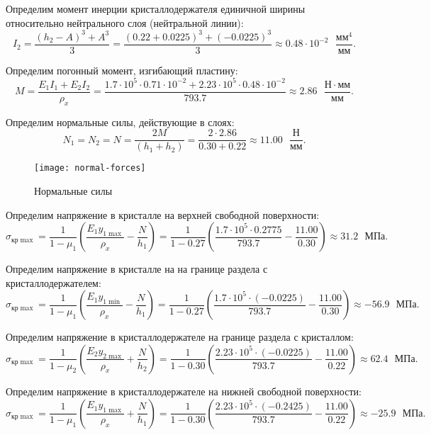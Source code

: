 Определим момент инерции кристаллодержателя единичной ширины относительно нейтрального слоя (нейтральной линии):
\[
    I_2 = \frac{(h_2 - A)^3 + A^3}{3}
        = \frac{(0.22 + 0.0225)^3 + (-0.0225)^3}{3}
        \approx 0.48 \cdot 10^{-2} \text{ } \frac{мм^4}{мм}.
\]

Определим погонный момент, изгибающий пластину:
\[
    M = \frac{E_1 I_1 + E_2 I_2}{\rho_x}
      = \frac{1.7 \cdot 10^5 \cdot 0.71 \cdot 10^{-2} + 2.23 \cdot 10^5 \cdot 0.48 \cdot 10^{-2}}{793.7}
      \approx 2.86 \text{ } \frac{Н \cdot мм}{мм}.
\]

Определим нормальные силы, действующие в слоях:
\[
    N_1 = N_2 = N
        = \frac{2M}{(h_1 + h_2)}
        = \frac{2 \cdot 2.86}{0.30 + 0.22}
        \approx 11.00 \text{ } \frac{Н}{мм}.
\]

\begin{figure}[h]
    \centering
    \texttt{[image: normal-forces]}
    \caption{Нормальные силы}
    \label{fig:normal-forces}
\end{figure}

Определим напряжение в кристалле на верхней свободной поверхности:
\[
    \sigma_{кр \max} = \frac{1}{1 - \mu_1} \left(\frac{E_1 y_{1\max}}{\rho_x} - \frac{N}{h_1}\right)
                     = \frac{1}{1 - 0.27} \left(\frac{1.7 \cdot 10^5 \cdot 0.2775}{793.7} - \frac{11.00}{0.30}\right)
                     \approx 31.2 \text{ } МПа.
\]

Определим напряжение в кристалле на на границе раздела с кристаллодержателем:
\[
    \sigma_{кр \max} = \frac{1}{1 - \mu_1} \left(\frac{E_1 y_{1\min}}{\rho_x} - \frac{N}{h_1}\right)
                     = \frac{1}{1 - 0.27} \left(\frac{1.7 \cdot 10^5 \cdot (-0.0225)}{793.7} - \frac{11.00}{0.30}\right)
                     \approx -56.9\text{ } МПа.
\]

Определим напряжение в кристаллодержателе на границе раздела с кристаллом:
\[
    \sigma_{кр \max} = \frac{1}{1 - \mu_2} \left(\frac{E_2 y_{2\max}}{\rho_x} + \frac{N}{h_2}\right)
                     = \frac{1}{1 - 0.30} \left(\frac{2.23 \cdot 10^5 \cdot (-0.0225)}{793.7} - \frac{11.00}{0.22}\right)
                     \approx 62.4\text{ } МПа.
\]

Определим напряжение в кристаллодержателе на нижней свободной поверхности:
\[
    \sigma_{кр \max} = \frac{1}{1 - \mu_1} \left(\frac{E_1 y_{1\max}}{\rho_x} + \frac{N}{h_1}\right)
                     = \frac{1}{1 - 0.30} \left(\frac{2.23 \cdot 10^5 \cdot (-0.2425)}{793.7} - \frac{11.00}{0.22}\right)
                     \approx -25.9\text{ } МПа.
\]

